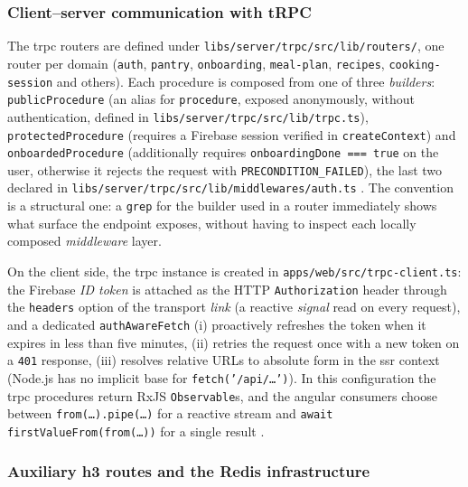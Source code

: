 \subsubsection{Client–server communication with tRPC}\label{subsec:comunicare-trpc}

The \gls{trpc} routers are defined under \texttt{libs/server/trpc/src/lib/routers/}, one router per domain (\texttt{auth}, \texttt{pantry}, \texttt{onboarding}, \texttt{meal-plan}, \texttt{recipes}, \texttt{cooking-session} and others). Each procedure is composed from one of three \textit{builders}: \texttt{publicProcedure} (an alias for \texttt{procedure}, exposed anonymously, without authentication, defined in \texttt{libs/server/trpc/src/lib/trpc.ts}), \texttt{protectedProcedure} (requires a Firebase session verified in \texttt{createContext}) and \texttt{onboardedProcedure} (additionally requires \texttt{onboardingDone === true} on the user, otherwise it rejects the request with \texttt{PRECONDITION\_FAILED}), the last two declared in \texttt{libs/\allowbreak server/\allowbreak trpc/\allowbreak src/\allowbreak lib/\allowbreak middlewares/\allowbreak auth.ts} \cite{trpc,trpc_middleware}. The convention is a structural one: a \texttt{grep} for the builder used in a router immediately shows what surface the endpoint exposes, without having to inspect each locally composed \textit{middleware} layer.

On the client side, the \gls{trpc} instance is created in \texttt{apps/web/src/trpc-client.ts}: the Firebase \textit{ID token} is attached as the HTTP \texttt{Authorization} header through the \texttt{headers} option of the transport \textit{link} (a reactive \textit{signal} read on every request), and a dedicated \texttt{authAwareFetch} (i) proactively refreshes the token when it expires in less than five minutes, (ii) retries the request once with a new token on a \texttt{401} response, (iii) resolves relative URLs to absolute form in the \acrshort{ssr} context (Node.js has no implicit base for \texttt{fetch('/api/\ldots')}). In this configuration the \gls{trpc} procedures return RxJS \texttt{Observable}s, and the \gls{angular} consumers choose between \texttt{from(\ldots).pipe(\ldots)} for a reactive stream and \texttt{await firstValueFrom(from(\ldots))} for a single result \cite{trpc}.

\subsubsection{Auxiliary h3 routes and the Redis infrastructure}\label{subsec:rute-h3-redis}

